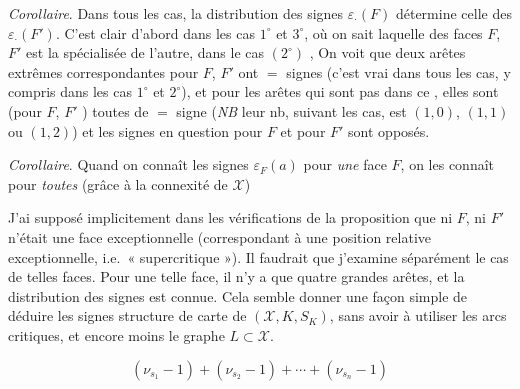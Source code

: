 \documentclass[11pt,a4paper]{article}
\begin{document}
\emph{Corollaire}. Dans tous les cas, la distribution des signes $\varepsilon_{\cdot}(F)$ détermine celle des $\varepsilon_{\cdot}(F')$.  C'est clair d'abord dans les cas $1^{\circ}$ et $3^{\circ}$, où on sait laquelle des faces $F$, $F'$ est la spécialisée de l'autre,   dans le cas $(2^{\circ})$ ,  On voit que   deux arêtes extrêmes correspondantes pour $F$, $F'$ ont $=$ signes (c'est vrai dans tous les cas, y compris dans les cas $1^{\circ}$ et $2^{\circ}$), et pour les arêtes qui \add{\ill{}} sont pas dans ce , elles sont (pour $F$, $F'$ ) toutes de $=$ signe (\emph{NB} leur nb, suivant les cas, est $(1, 0)$, $(1, 1)$ ou $(1, 2)$) et les signes en question pour $F$ et pour $F'$ sont opposés.

\emph{Corollaire}. Quand on connaît les signes $\varepsilon_F(a)$ pour \emph{une} face $F$, on les connaît pour \emph{toutes} (grâce à la connexité de $\mathcal{X}$)

J'ai supposé implicitement  dans les vérifications de la proposition que ni $F$, ni $F'$ n'était une face exceptionnelle (correspondant à une position relative exceptionnelle, i.e.\ « supercritique »). Il faudrait que j'examine séparément le cas de telles faces. Pour une telle face, il n'y a que quatre grandes arêtes, et la distribution des signes est connue. Cela semble donner une façon simple  de déduire les signes   structure de carte de $(\mathcal{X}, K, S_K)$, sans avoir à utiliser les arcs critiques, et encore moins  le \struck{\ill{}} graphe $L \subset \mathcal{X}$.


\[
(\nu_{s_1} - 1) + (\nu_{s_2} - 1) + \cdots + (\nu_{s_n} - 1)
\]
\end{document}
